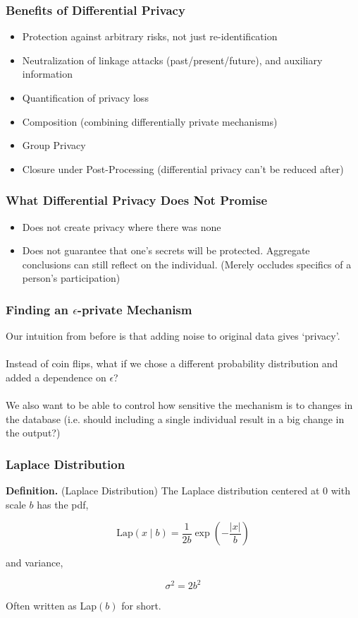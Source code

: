 \documentclass[aspectratio=169]{beamer}
\begin{document}
\begin{frame}
\frametitle{Benefits of Differential Privacy}
\begin{itemize}
  \item Protection against arbitrary risks, not just re-identification
  \item Neutralization of linkage attacks (past/present/future), and auxiliary information
  \item Quantification of privacy loss
  \item Composition (combining differentially private mechanisms)
  \item Group Privacy
  \item Closure under Post-Processing (differential privacy can't be reduced after)
\end{itemize}
\end{frame}

\begin{frame}
\frametitle{What Differential Privacy Does Not Promise}

\begin{itemize}
  \item Does not create privacy where there was none
  \item Does not guarantee that one's secrets will be protected. Aggregate conclusions can still reflect on the individual. (Merely occludes specifics of a person's participation)
\end{itemize}
\end{frame}


\begin{frame}
\frametitle{Finding an $\epsilon$-private Mechanism}
Our intuition from before is that adding noise to original data gives `privacy'.\\~\\

Instead of coin flips, what if we chose a different probability distribution and added a dependence on $\epsilon$?\\~\\

We also want to be able to control how sensitive the mechanism is to changes in the database (i.e. should including a single individual result in a big change in the output?)
\end{frame}

\begin{frame}
\frametitle{Laplace Distribution}

\textbf{Definition.} (Laplace Distribution) The Laplace distribution centered at 0 with scale $b$ has the pdf,

$$\text{Lap}(x\mid b) = \frac{1}{2b} \exp(-\frac{|x|}{b})$$

and variance,

$$\sigma^2 = 2b^2$$

Often written as Lap$(b)$ for short.
\end{frame}
\end{document}
